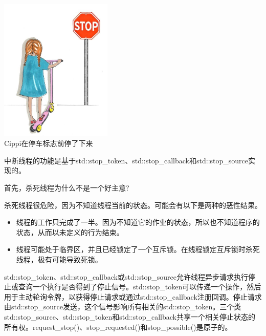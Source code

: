 \begin{center}
\includegraphics[width=0.4\textwidth]{content/3/chapter6/images/22.png}\\
Cippi在停车标志前停了下来
\end{center}

中断线程的功能是基于std::stop\_token、std::stop\_callback和std::stop\_source实现的。

首先，杀死线程为什么不是一个好主意?

\begin{tcolorbox}[breakable,enhanced jigsaw,colback=red!5!white,colframe=red!75!black,title={杀死线程很危险}]
	
杀死线程很危险，因为不知道线程当前的状态。可能会有以下是两种的恶性结果。

\begin{itemize}
\item 
线程的工作只完成了一半。因为不知道它的作业的状态，所以也不知道程序的状态，从而以未定义的行为结束。

\item 
线程可能处于临界区，并且已经锁定了一个互斥锁。在线程锁定互斥锁时杀死线程，极有可能导致死锁。
\end{itemize}
\end{tcolorbox}


std::stop\_token、std::stop\_callback或std::stop\_source允许线程异步请求执行停止或查询一个执行是否得到了停止信号。std::stop\_token可以传递一个操作，然后用于主动轮询令牌，以获得停止请求或通过std::stop\_callback注册回调。停止请求由std::stop\_source发送，这个信号影响所有相关的std::stop\_token。三个类std::stop\_source、std::stop\_token和std::stop\_callback共享一个相关停止状态的所有权。request\_stop()、stop\_requested()和stop\_possible()是原子的。


